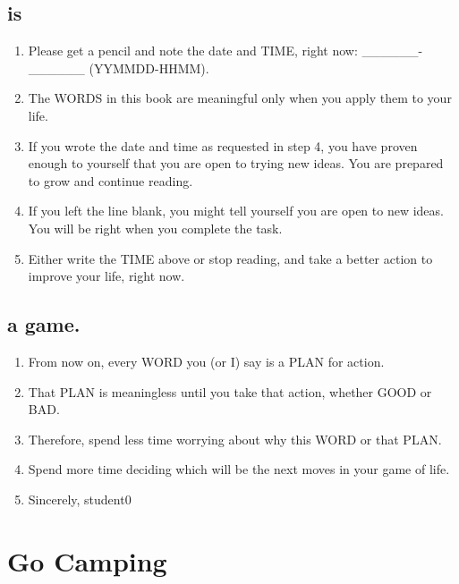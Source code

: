 \documentclass[
]{book}
\providecommand{\tightlist}{%
  \setlength{\itemsep}{0pt}\setlength{\parskip}{0pt}}
\begin{document}
\hypertarget{is}{%
\subsection{is}\label{is}}

\begin{enumerate}
\def\labelenumi{\arabic{enumi}.}
\setcounter{enumi}{3}
\tightlist
\item
  Please get a pencil and note the date and TIME, right now: \_\_\_\_\_\_-\_\_\_\_\_\_ (YYMMDD-HHMM).
\item
  The WORDS in this book are meaningful only when you apply them to your life.
\item
  If you wrote the date and time as requested in step 4, you have proven enough to yourself that you are open to trying
  new ideas. You are prepared to grow and continue reading.
\item
  If you left the line blank, you might tell yourself you are open to new ideas. You
  will be right when you complete the task.
\item
  Either write the TIME above or stop reading, and take a better action to improve
  your life, right now.
\end{enumerate}

\hypertarget{a-game.}{%
\subsection{a game.}\label{a-game.}}

\begin{enumerate}
\def\labelenumi{\arabic{enumi}.}
\setcounter{enumi}{8}
\item
  From now on, every WORD you (or I) say is a PLAN for action.
\item
  That PLAN is meaningless until you take that action, whether GOOD or BAD.
\item
  Therefore, spend less time worrying about why this WORD or that PLAN.
\item
  Spend more time deciding which will be the next moves in your game of life.
\item
  Sincerely, student0
\end{enumerate}

\hypertarget{go-camping}{%
\section{Go Camping}\label{go-camping}}
\end{document}
